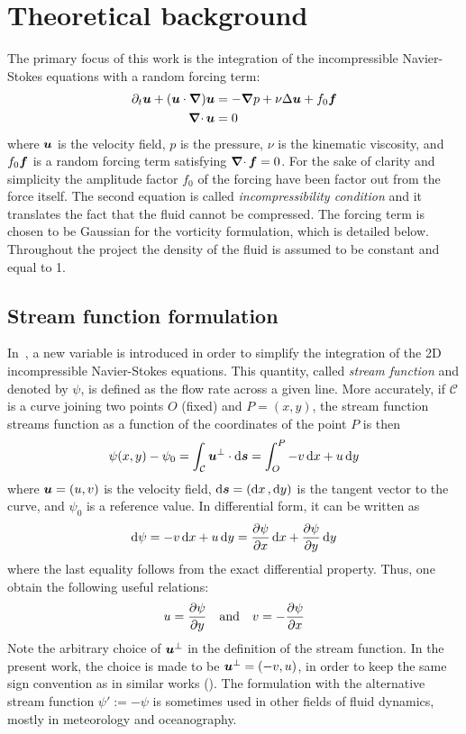 \documentclass[../main.tex]{subfiles}
\begin{document}
\section{Theoretical background}\label{sec:equations}
The primary focus of this work is the integration of the incompressible Navier-Stokes equations with a random forcing term:
\begin{align}
	\label{eq:navier-stokes}\partial_t \boldsymbol{u} + (\boldsymbol{u} \cdot \grad) \boldsymbol{u} & = -\grad p + \nu\Delta \boldsymbol{u} + f_0\boldsymbol{f} \\
	\label{eq:incompressibility}\operatorname{\boldsymbol{\nabla}\cdot}{\boldsymbol{u}}                               & = 0
\end{align}
where $\boldsymbol{u}$ is the velocity field, $p$ is the pressure, $\nu$ is the kinematic viscosity, and $f_0\boldsymbol{f}$ is a random forcing term satisfying $\operatorname{\boldsymbol{\nabla}\cdot}{\boldsymbol{f}}=0$. For the sake of clarity and simplicity the amplitude factor $f_0$ of the forcing have been factor out from the force itself. The second equation is called	\emph{incompressibility condition} and it translates the fact that the fluid cannot be compressed. The forcing term is chosen to be Gaussian for the vorticity formulation, which is detailed below. Throughout the project the density of the fluid is assumed to be constant and equal to 1.

\subsection{Stream function formulation}
In~\cite{Batchelor2000}, a new variable is introduced in order to simplify the integration of the 2D incompressible Navier-Stokes equations. This quantity, called \emph{stream function} and denoted by $\psi$, is defined as the flow rate across a given line. More accurately, if $\mathcal{C}$ is a curve joining two points $O$ (fixed) and $P=(x,y)$, the stream function streams function as a function of the coordinates of the point $P$ is then
\begin{equation}
	\psi(x,y) -\psi_0 = \int_{\mathcal{C}} \boldsymbol{u}^\perp \cdot \dd{\boldsymbol{s}}= \int_{O}^{P} -v \dd{x} + u \dd{y}
\end{equation}
where $\boldsymbol{u} = (u,v)$ is the velocity field, $\dd{\boldsymbol{s}}=(\dd{x},\dd{y})$ is the tangent vector to the curve, and $\psi_0$ is a reference value. In differential form, it can be written as
\begin{equation}
	\dd{\psi} = -v \dd{x} + u \dd{y} = \pdv{\psi}{x} \dd{x} + \pdv{\psi}{y} \dd{y}
\end{equation}
where the last equality follows from the exact differential property. Thus, one obtain the following useful relations:
\begin{equation}
	u = \pdv{\psi}{y} \quad \text{and} \quad v = -\pdv{\psi}{x}
\end{equation}
Note the arbitrary choice of $\boldsymbol{u}^\perp$ in the definition of the stream function. In the present work, the choice is made to be $\boldsymbol{u}^\perp = (-v,u)$, in order to keep the same sign convention as in similar works (\cite{2dturbulence,alexakisLONG}). The formulation with the alternative stream function $\psi':=-\psi$ is sometimes used in other fields of fluid dynamics, mostly in meteorology and oceanography.
\end{document}
